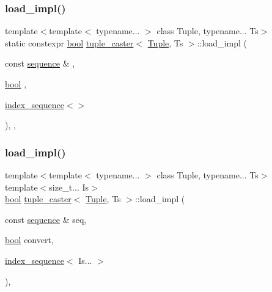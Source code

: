 \mbox{\label{classtuple__caster_a69ae2feb001453601165fc693e74584b}} 
\subsubsection{\texorpdfstring{load\_impl()}{load\_impl()}\hspace{0.1cm}{\footnotesize\ttfamily [1/2]}}
{\footnotesize\ttfamily template$<$template$<$ typename... $>$ class Tuple, typename... Ts$>$ \\
static constexpr \mbox{\hyperlink{asdl_8h_af6a258d8f3ee5206d682d799316314b1}{bool}} \mbox{\hyperlink{classtuple__caster}{tuple\+\_\+caster}}$<$ \mbox{\hyperlink{_python-ast_8h_a3f332c0be139cb870e516bad9b6a9366}{Tuple}}, Ts $>$\+::load\+\_\+impl (\begin{DoxyParamCaption}\item[{const \mbox{\hyperlink{classsequence}{sequence}} \&}]{,  }\item[{\mbox{\hyperlink{asdl_8h_af6a258d8f3ee5206d682d799316314b1}{bool}}}]{,  }\item[{\mbox{\hyperlink{structindex__sequence}{index\+\_\+sequence}}$<$$>$}]{ }\end{DoxyParamCaption})\hspace{0.3cm}{\ttfamily [inline]}, {\ttfamily [static]}, {\ttfamily [protected]}}

\mbox{\label{classtuple__caster_a86bacf2d7f440d7cc2f42620c9622f19}} 
\subsubsection{\texorpdfstring{load\_impl()}{load\_impl()}\hspace{0.1cm}{\footnotesize\ttfamily [2/2]}}
{\footnotesize\ttfamily template$<$template$<$ typename... $>$ class Tuple, typename... Ts$>$ \\
template$<$size\+\_\+t... Is$>$ \\
\mbox{\hyperlink{asdl_8h_af6a258d8f3ee5206d682d799316314b1}{bool}} \mbox{\hyperlink{classtuple__caster}{tuple\+\_\+caster}}$<$ \mbox{\hyperlink{_python-ast_8h_a3f332c0be139cb870e516bad9b6a9366}{Tuple}}, Ts $>$\+::load\+\_\+impl (\begin{DoxyParamCaption}\item[{const \mbox{\hyperlink{classsequence}{sequence}} \&}]{seq,  }\item[{\mbox{\hyperlink{asdl_8h_af6a258d8f3ee5206d682d799316314b1}{bool}}}]{convert,  }\item[{\mbox{\hyperlink{structindex__sequence}{index\+\_\+sequence}}$<$ Is... $>$}]{ }\end{DoxyParamCaption})\hspace{0.3cm}{\ttfamily [inline]}, {\ttfamily [protected]}}

